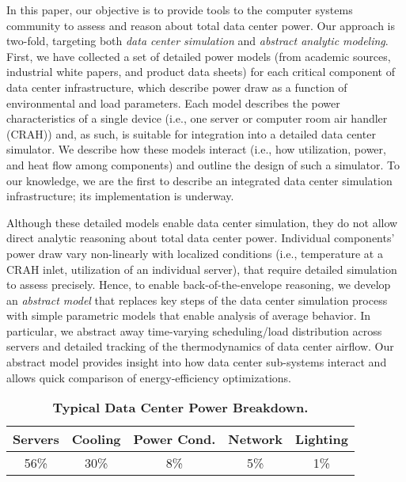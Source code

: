 In this paper, our objective is to provide tools to the computer systems community to assess and reason about total data center power.  Our approach is two-fold, targeting both \emph{data center simulation} and \emph{abstract analytic modeling}.  First, we have collected a set of detailed power models (from academic sources, industrial white papers, and product data sheets) for each critical component of data center infrastructure, which describe power draw as a function of environmental and load parameters.  Each model describes the power characteristics of a single device (i.e., one server or computer room air handler (CRAH)) and, as such, is suitable for integration into a detailed data center simulator.  We describe how these models interact (i.e., how utilization, power, and heat flow among components) and outline the design of such a simulator. To our knowledge, we are the first to describe an integrated data center simulation infrastructure; its implementation is underway.

Although these detailed models enable data center simulation, they do not allow direct analytic reasoning about total data center power.  Individual components' power draw vary non-linearly with localized conditions (i.e., temperature at a CRAH inlet, utilization of an individual server), that require detailed simulation to assess precisely.  Hence, to enable back-of-the-envelope reasoning, we develop an \emph{abstract model} that replaces key steps of the data center simulation process with simple parametric models that enable analysis of average behavior.  In particular, we abstract away time-varying scheduling/load distribution across servers and detailed tracking of the thermodynamics of data center airflow.  Our abstract model provides insight into how data center sub-systems interact and allows quick comparison of energy-efficiency optimizations.

\begin{table}[t]
\begin{center}
\caption{ \textbf{Typical Data Center Power Breakdown.} }
\label{table::PowerDistribution}

\begin{tabularx}{\linewidth}{c c c c c}
    \toprule
    Servers & Cooling & Power Cond. & Network & Lighting \\
    \midrule
    56\% & 30\% & 8\% & 5\% & 1\% \\
    \bottomrule
  \end{tabularx}
\end{center}

\end{table}
